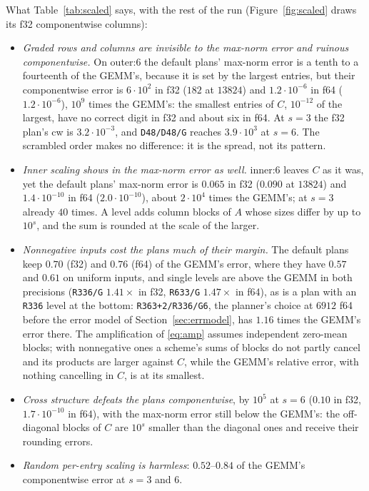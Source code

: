 \documentclass[11pt]{article}
\newcommand{\lv}[1]{\texttt{#1}}
\begin{document}
What Table~\ref{tab:scaled} says, with the rest of the run (Figure~\ref{fig:scaled} draws its f32 componentwise columns):
\begin{itemize}
\item \emph{Graded rows and columns are invisible to the max-norm error and ruinous componentwise.}  On outer:6 the default plans' max-norm error is a tenth to a fourteenth
  of the GEMM's, because it is set by the largest entries, but their
  componentwise error is $6\cdot10^2$ in f32 ($182$ at $13824$) and $1.2\cdot10^{-6}$
  in f64 ($1.2\cdot10^{-6}$), $10^9$ times the GEMM's: the smallest entries
  of $C$, $10^{-12}$ of the largest, have no correct digit in f32 and about
  six in f64.  At $s=3$ the f32 plan's cw is $3.2\cdot10^{-3}$, and
  \lv{D48/D48/G} reaches $3.9\cdot10^3$ at $s=6$.  The scrambled order makes
  no difference: it is the spread, not its pattern.
\item \emph{Inner scaling shows in the max-norm error as well.}  inner:6 leaves $C$ as it
  was, yet the default plans' max-norm error is $0.065$ in f32 ($0.090$ at $13824$) and
  $1.4\cdot10^{-10}$ in f64 ($2.0\cdot10^{-10}$), about $2\cdot10^4$ times the
  GEMM's; at $s=3$ already $40$ times.  A level adds column blocks of $A$
  whose sizes differ by up to $10^s$, and the sum is rounded at the scale of
  the larger.
\item \emph{Nonnegative inputs cost the plans much of their margin.}  The
  default plans keep $0.70$ (f32) and $0.76$ (f64) of the GEMM's error, where
  they have $0.57$ and $0.61$ on uniform inputs, and single levels are above the GEMM in both precisions (\lv{R336/G} $1.41\times$ in
  f32, \lv{R633/G} $1.47\times$ in f64), as is a plan with an \lv{R336} level
  at the bottom: \lv{R363+2/R336/G6}, the planner's choice at $6912$ f64 before
  the error model of Section~\ref{sec:errmodel}, has $1.16$ times the GEMM's error there.  The amplification of
  \eqref{eq:amp} assumes independent zero-mean blocks; with nonnegative ones
  a scheme's sums of blocks do not partly cancel and its products are larger
  against $C$, while the GEMM's relative error, with nothing cancelling in
  $C$, is at its smallest.
\item \emph{Cross structure defeats the plans componentwise}, by $10^5$ at
  $s=6$ ($0.10$ in f32, $1.7\cdot10^{-10}$ in f64), with the max-norm error still below the
  GEMM's: the off-diagonal blocks of $C$ are $10^s$ smaller than the diagonal
  ones and receive their rounding errors.
\item \emph{Random per-entry scaling is harmless}: $0.52$--$0.84$ of
  the GEMM's componentwise error at $s=3$ and $6$.
\end{itemize}
\end{document}
